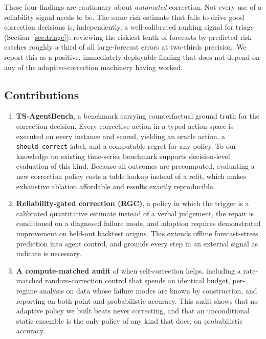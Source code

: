 These four findings are cautionary about \emph{automated} correction. Not every use of a
reliability signal needs to be. The same risk estimate that fails to drive good
correction decisions is, independently, a well-calibrated ranking signal for triage
(Section~\ref{sec:triage}): reviewing the riskiest tenth of forecasts by predicted risk
catches roughly a third of all large-forecast errors at two-thirds precision. We report
this as a positive, immediately deployable finding that does not depend on any of the
adaptive-correction machinery having worked.

\subsection{Contributions}

\begin{enumerate}
  \item \textbf{TS-AgentBench}, a benchmark carrying counterfactual ground truth for the
  correction decision. Every corrective action in a typed action space is executed on
  every instance and scored, yielding an oracle action, a \texttt{should\_correct}
  label, and a computable regret for any policy. To our knowledge no existing
  time-series benchmark supports decision-level evaluation of this kind. Because all
  outcomes are precomputed, evaluating a new correction policy costs a table lookup
  instead of a refit, which makes exhaustive ablation affordable and results exactly
  reproducible.

  \item \textbf{Reliability-gated correction (RGC)}, a policy in which the trigger is a
  calibrated quantitative estimate instead of a verbal judgement, the repair is
  conditioned on a diagnosed failure mode, and adoption requires demonstrated
  improvement on held-out backtest origins. This extends offline forecast-stress
  prediction \citep{fformpp2019,mast2025} into agent control, and grounds every step in
  an external signal as \citet{kamoi2024selfcorrect} indicate is necessary.

  \item \textbf{A compute-matched audit} of when self-correction helps, including a
  rate-matched random-correction control that spends an identical budget, per-regime
  analysis on data whose failure modes are known by construction, and reporting on both
  point and probabilistic accuracy. This audit shows that no adaptive policy we built
  beats never correcting, and that an unconditional static ensemble is the only policy
  of any kind that does, on probabilistic accuracy.


\end{enumerate}

